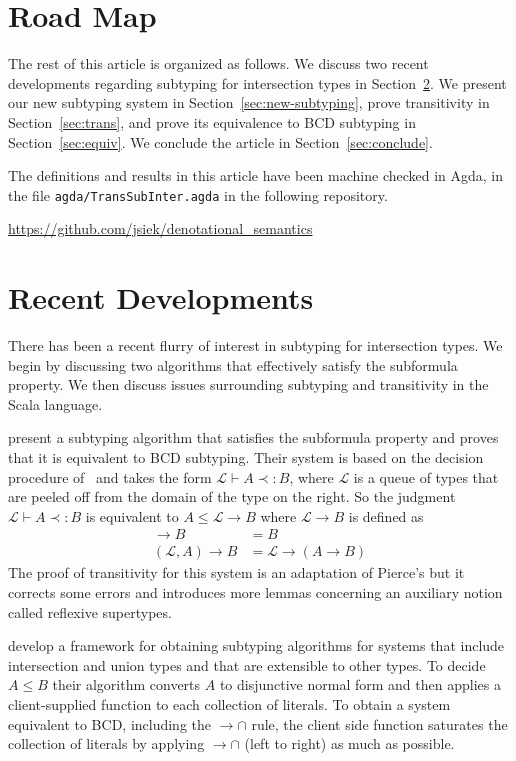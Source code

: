 \documentclass{article}
\begin{document}
\section{Road Map}
\label{sec:road-map}

The rest of this article is organized as follows. We discuss two
recent developments regarding subtyping for intersection types in
Section~\ref{sec:recent-developments}.  We present our new subtyping
system in Section~\ref{sec:new-subtyping}, prove transitivity in
Section~\ref{sec:trans}, and prove its equivalence to BCD subtyping in
Section~\ref{sec:equiv}. We conclude the article in
Section~\ref{sec:conclude}.

The definitions and results in this article have been machine checked
in Agda, in the file \texttt{agda/TransSubInter.agda} in the following
repository.
\begin{center}
  \url{https://github.com/jsiek/denotational_semantics}
\end{center}

\section{Recent Developments}
\label{sec:recent-developments}

There has been a recent flurry of interest in subtyping for
intersection types. We begin by discussing two algorithms that
effectively satisfy the subformula property. We then discuss issues
surrounding subtyping and transitivity in the Scala language.

\citet{Bi:2018aa} present a subtyping algorithm that satisfies the
subformula property and proves that it is equivalent to BCD
subtyping. Their system is based on the decision procedure
of~\citet{Pierce:1989aa} and takes the form $\mathcal{L} \vdash A
\prec: B$, where $\mathcal{L}$ is a queue of types that are peeled off
from the domain of the type on the right. So the judgment
$\mathcal{L} \vdash A \prec: B$ is equivalent to $A \leq \mathcal{L}
\to B$ where $\mathcal{L} \to B$ is defined as
\begin{align*}
  [] \to B &= B\\
  (\mathcal{L},A) \to B &= \mathcal{L} \to (A \to B)
\end{align*}
The proof of transitivity for this system is an adaptation of Pierce's
but it corrects some errors and introduces more lemmas concerning an
auxiliary notion called reflexive supertypes.

\citet{Muehlboeck:2018aa} develop a framework for obtaining subtyping
algorithms for systems that include intersection and union types and
that are extensible to other types. To decide $A \leq B$ their
algorithm converts $A$ to disjunctive normal form and then applies a
client-supplied function to each collection of literals. To obtain a
system equivalent to BCD, including the ${\to}{\cap}$ rule, the client
side function saturates the collection of literals by applying
${\to}{\cap}$ (left to right) as much as possible.
\end{document}
